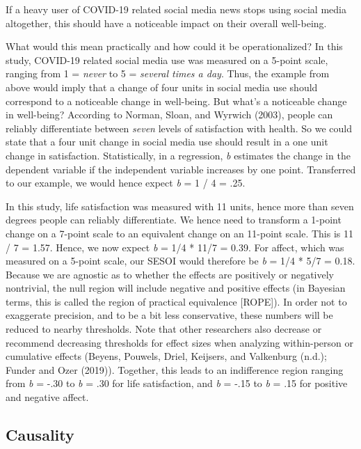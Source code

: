 \documentclass[
  english,
  man,mask,floatsintext]{apa6}
\begin{document}
If a heavy user of COVID-19 related social media news stops using social media altogether, this should have a noticeable impact on their overall well-being.

What would this mean practically and how could it be operationalized?
In this study, COVID-19 related social media use was measured on a 5-point scale, ranging from 1 = \emph{never} to 5 = \emph{several times a day}.
Thus, the example from above would imply that a change of four units in social media use should correspond to a noticeable change in well-being.
But what's a noticeable change in well-being?
According to Norman, Sloan, and Wyrwich (2003), people can reliably differentiate between \emph{seven} levels of satisfaction with health.
So we could state that a four unit change in social media use should result in a one unit change in satisfaction.
Statistically, in a regression, \emph{b} estimates the change in the dependent variable if the independent variable increases by one point.
Transferred to our example, we would hence expect \emph{b} = 1 / 4 = .25.

In this study, life satisfaction was measured with 11 units, hence more than seven degrees people can reliably differentiate.
We hence need to transform a 1-point change on a 7-point scale to an equivalent change on an 11-point scale.
This is 11 / 7 = 1.57.
Hence, we now expect \emph{b} = 1/4 * 11/7 = 0.39.
For affect, which was measured on a 5-point scale, our SESOI would therefore be \emph{b} = 1/4 * 5/7 = 0.18.
Because we are agnostic as to whether the effects are positively or negatively nontrivial, the null region will include negative and positive effects (in Bayesian terms, this is called the region of practical equivalence {[}ROPE{]}).
In order not to exaggerate precision, and to be a bit less conservative, these numbers will be reduced to nearby thresholds.
Note that other researchers also decrease or recommend decreasing thresholds for effect sizes when analyzing within-person or cumulative effects (Beyens, Pouwels, Driel, Keijsers, and Valkenburg (n.d.); Funder and Ozer (2019)).
Together, this leads to an indifference region ranging from \emph{b} = -.30 to \emph{b} = .30 for life satisfaction, and \emph{b} = -.15 to \emph{b} = .15 for positive and negative affect.

\hypertarget{causality}{%
\subsection{Causality}\label{causality}}
\end{document}
